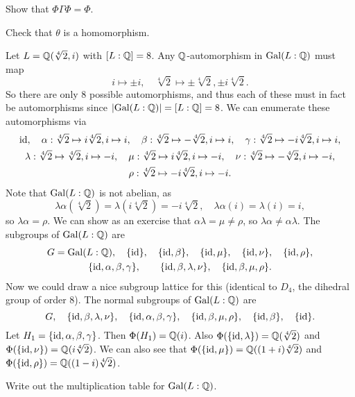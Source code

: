 \begin{exercise}
  Show that $\Phi \Gamma \Phi = \Phi$.
\end{exercise}

\begin{exercise}
  Check that $\theta$ is a homomorphism.
\end{exercise}

\begin{example}
  \label{ex:big-galois-correspondence}
  Let $L = \mathbb{Q}(\sqrt[4]{2}, i)$ with $[L : \mathbb{Q}] = 8$.
  Any $\mathbb{Q}$-automorphism in $\operatorname{Gal}(L : \mathbb{Q})$ must map
  \[
    i \mapsto \pm i, \quad \sqrt[4]{2} \mapsto \pm \sqrt[4]{2}, \pm i\sqrt[4]{2}.
  \]
  So there are only $8$ possible automorphisms, and thus
  each of these must in fact be automorphisms since
  $|{\operatorname{Gal}(L : \mathbb{Q})}| = [L : \mathbb{Q}] = 8$. We can enumerate these
  automorphisms via
  \begin{gather*}
    \mathrm{id}, \quad \alpha : \sqrt[4]{2} \mapsto i\sqrt[4]{2}, i \mapsto i, \quad
    \beta : \sqrt[4]{2} \mapsto -\sqrt[4]{2}, i \mapsto i,
    \quad \gamma : \sqrt[4]{2} \mapsto -i\sqrt[4]{2}, i \mapsto i, \\
    \lambda : \sqrt[4]{2} \mapsto \sqrt[4]{2}, i \mapsto -i, \quad
    \mu : \sqrt[4]{2} \mapsto i\sqrt[4]{2}, i \mapsto -i, \quad
    \nu : \sqrt[4]{2} \mapsto -\sqrt[4]{2}, i \mapsto -i,  \\
    \rho : \sqrt[4]{2} \mapsto -i\sqrt[4]{2}, i \mapsto -i.
  \end{gather*}
  Note that $\operatorname{Gal}(L : \mathbb{Q})$ is not abelian, as
  \[
    \lambda\alpha(\sqrt[4]{2}) = \lambda(i\sqrt[4]{2})
    = -i\sqrt[4]{2}, \quad \lambda \alpha(i) = \lambda(i)
    = i,
  \]
  so $\lambda \alpha = \rho$. We can show as an exercise
  that $\alpha \lambda = \mu \ne \rho$, so
  $\lambda \alpha \ne \alpha \lambda$. The subgroups of
  $\operatorname{Gal}(L : \mathbb{Q})$ are
  \begin{gather*}
    G = \operatorname{Gal}(L : \mathbb{Q}), \quad \{\mathrm{id}\}, \quad
    \{\mathrm{id}, \beta\}, \quad \{\mathrm{id}, \mu\}, \quad
    \{\mathrm{id}, \nu\}, \quad \{\mathrm{id}, \rho\}, \\
    \{\mathrm{id}, \alpha, \beta, \gamma\}, \quad
    \quad \{\mathrm{id}, \beta, \lambda, \nu\},
    \quad \{\mathrm{id}, \beta, \mu, \rho\}.
  \end{gather*}
  Now we could draw a nice subgroup lattice for this
  (identical to $D_4$, the dihedral group of order $8$).
  The normal subgroups of $\operatorname{Gal}(L : \mathbb{Q})$ are
  \[
    G, \quad \{\mathrm{id}, \beta, \lambda, \nu\},
    \quad \{\mathrm{id}, \alpha, \beta, \gamma\}, \quad
    \{\mathrm{id}, \beta, \mu, \rho\}, \quad \{\mathrm{id}, \beta\},
    \quad \{\mathrm{id}\}.
  \]
  Let $H_1 = \{\mathrm{id}, \alpha, \beta, \gamma\}$. Then
  $\Phi(H_1) = \mathbb{Q}(i)$. Also
  $\Phi(\{\mathrm{id}, \lambda\}) = \mathbb{Q}(\sqrt[4]{2})$ and
  $\Phi(\{\mathrm{id}, \nu\}) = \mathbb{Q}(i\sqrt[4]{2})$. We can also
  see that $\Phi(\{\mathrm{id}, \mu\}) = \mathbb{Q}((1 + i)\sqrt[4]{2})$
  and $\Phi(\{\mathrm{id}, \rho\}) = \mathbb{Q}((1 - i)\sqrt[4]{2})$.
\end{example}

\begin{exercise}
  Write out the multiplication table for $\operatorname{Gal}(L : \mathbb{Q})$.
\end{exercise}
